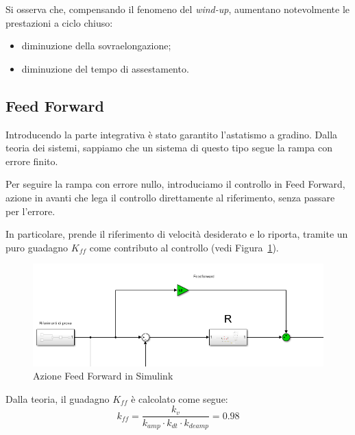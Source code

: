 \documentclass[a4paper,12pt]{article}
\begin{document}
\vspace{0.5cm}

Si osserva che, compensando il fenomeno del \textit{wind-up}, aumentano notevolmente le prestazioni a ciclo chiuso:
\begin{itemize}
    \item diminuzione della sovraelongazione;
    \item diminuzione del tempo di assestamento.
\end{itemize}

\vspace{0.5cm}

\subsection{Feed Forward}

Introducendo la parte integrativa è stato garantito l'astatismo a gradino. Dalla teoria dei sistemi, sappiamo che un sistema di questo tipo segue la rampa con errore finito.

Per seguire la rampa con errore nullo, introduciamo il controllo in Feed Forward, azione in avanti che lega il controllo direttamente al riferimento, senza passare per l'errore.

In particolare, prende il riferimento di velocità desiderato e lo riporta, tramite un puro guadagno $K_{ff}$ come contributo al controllo (vedi Figura~\ref{fig: FFSimulink}). 

\vspace{0.5cm}

\begin{figure}[h!]
    \centering
    \includegraphics[scale=0.6]{Immagini/Altre/feedForwardSimulink.PNG}
    \caption{Azione Feed Forward in Simulink}
    \label{fig: FFSimulink}
\end{figure}

\vspace{0.5cm}

Dalla teoria, il guadagno $K_{ff}$ è calcolato come segue:
\[
    k_{ff} = \frac{k_v}{k_{amp} \cdot k_{dt} \cdot k_{deamp}}=0.98
\]
\end{document}

